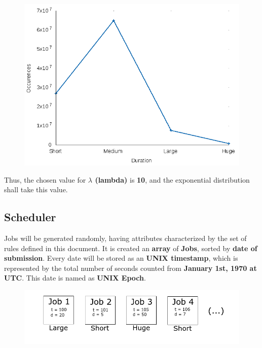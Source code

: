 \documentclass{scrreprt}
\begin{document}
\begin{figure}[!htb]
\begin{minipage}{.33\textwidth}
\end{minipage}
\begin{minipage}{.33\textwidth}
  \centering
  \includegraphics[width=.9\linewidth]{typeslambda20.png}
\end{minipage}
\end{figure}


Thus, the chosen value for \textbf{$\lambda$ (lambda)} is \textbf{10}, and the exponential distribution shall take this value.

\newpage

\subsection{Scheduler}

\par Jobs will be generated randomly, having attributes characterized by the set of rules defined in this document. It is created an \textbf{array} of \textbf{Jobs}, sorted by \textbf{date of submission}. Every date will be stored as an \textbf{UNIX timestamp}, which is represented by the total number of seconds counted from \textbf{January 1st, 1970 at UTC}. This date is named as \textbf{UNIX Epoch}.

\begin{figure}[!htb]
  \centering
  \includegraphics[width=\linewidth]{jobs.png}
\end{figure}
\end{document}
